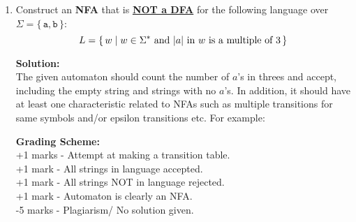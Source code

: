 \documentclass[11pt, article, oneside]{memoir}
\newcommand{\set}[1]{\{\, #1\, \}}
\DeclarePairedDelimiter\abs{\lvert}{\rvert}
\begin{document}
\begin{enumerate}
    \item
        Construct an \textbf{NFA} that is \textbf{\underline{NOT a DFA}} for the following language over \(\Sigma = \set{\texttt{a}, \texttt{b}}\):
        \[
            L = \set{w \mid w \in \Sigma^* \text{ and }
            \text{\(\abs{a}\) in \(w\) is a multiple of \(3\)}}
        \]
        
        \textbf{Solution:}
        \\The given automaton should count the number of \(a\)'s in threes and accept, including the empty string and strings with no \(a\)'s. In addition, it should have at least one characteristic related to NFAs such as multiple transitions for same symbols and/or epsilon transitions etc. For example:
        \begin{center}
        \end{center}

        \textbf{Grading Scheme:}
        \\+1 marks - Attempt at making a transition table.
        \\+1 mark - All strings in language accepted.
        \\+1 mark - All strings NOT in language rejected.
        \\+1 mark - Automaton is clearly an NFA.
        \\-5 marks -  Plagiarism/ No solution given.
        

\end{enumerate}
\end{document}
